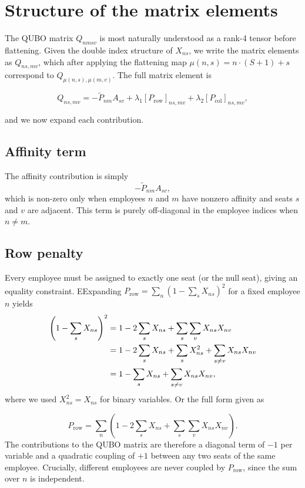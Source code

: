 \documentclass[10pt]{article}
\theoremstyle{definition}
\theoremstyle{plain}
\theoremstyle{remark}
\begin{document}
	\section{Structure of the matrix elements}
	
	The QUBO matrix $Q_{nmsv}$ is most naturally understood as a rank-4 tensor 
	before flattening. Given the double index structure of $X_{ns}$, we write the 
	matrix elements as $Q_{ns, mv}$, which after applying the flattening map 
	$\mu(n,s) = n \cdot (S+1) + s$ correspond to $Q_{\mu(n,s),\mu(m,v)}$. 
	The full matrix element is
	
	\begin{equation}
		Q_{ns,mv} = -\tilde{P}_{nm} A_{sv} 
		+ \lambda_1 [P_{\text{row}}]_{ns,mv} 
		+ \lambda_2 [P_{\text{col}}]_{ns,mv},
	\end{equation}
	
	and we now expand each contribution.
	
	\subsection{Affinity term}
	The affinity contribution is simply
	\begin{equation}
		-\tilde{P}_{nm} A_{sv},
	\end{equation}
	which is non-zero only when employees $n$ and $m$ have nonzero affinity and seats 
	$s$ and $v$ are adjacent. This term is purely off-diagonal in the employee indices 
	when $n \neq m$.
	
	\subsection{Row penalty}
	Every employee must be assigned to exactly one seat (or the null seat), giving
	an equality constraint. EExpanding $P_\text{row} = \sum_n \left(1 - \sum_s X_{ns}\right)^2$ for a fixed employee $n$ yields
	\begin{align}
		\left(1 - \sum_s X_{ns}\right)^2
		&= 1 - 2\sum_s X_{ns} + \sum_s\sum_{v} X_{ns}X_{nv} \notag \\
		&= 1 - 2\sum_s X_{ns} + \sum_s X_{ns}^2 + \sum_{s \neq v} X_{ns}X_{nv} \notag \\
		&= 1 - \sum_s X_{ns} + \sum_{s \neq v} X_{ns}X_{nv},
	\end{align}
	where we used $X_{ns}^2 = X_{ns}$ for binary variables. Or the full form given as
	
	\begin{equation}
		P_\text{row} = \sum_n \left(1 - 2\sum_s X_{ns} + \sum_s \sum_{v} X_{ns} X_{nv}\right).
	\end{equation}
	The contributions to the
	QUBO matrix are therefore a diagonal term of $-1$ per variable and a quadratic
	coupling of $+1$ between any two seats of the same employee. Crucially, different
	employees are never coupled by $P_\text{row}$, since the sum over $n$ is independent.
	
\end{document}
